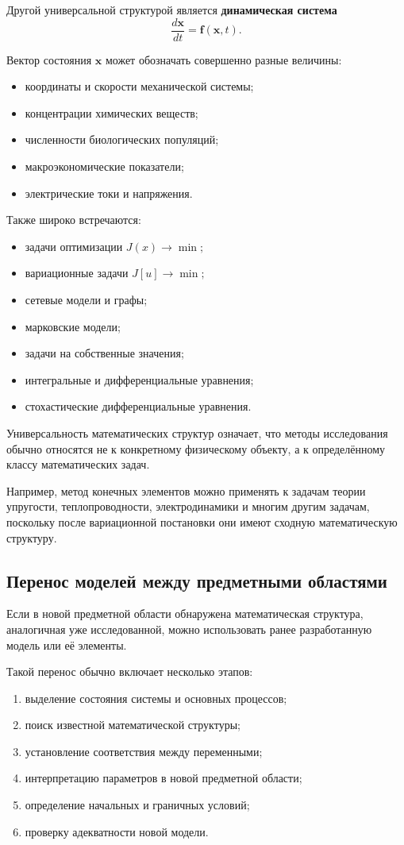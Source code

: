 Другой универсальной структурой является \textbf{динамическая система}
\[
\frac{d\mathbf x}{dt}
=
\mathbf f(\mathbf x,t).
\]

Вектор состояния $\mathbf x$ может обозначать совершенно разные величины:
\begin{itemize}
	\item координаты и скорости механической системы;
	\item концентрации химических веществ;
	\item численности биологических популяций;
	\item макроэкономические показатели;
	\item электрические токи и напряжения.
\end{itemize}

Также широко встречаются:
\begin{itemize}
	\item задачи оптимизации $J(x)\rightarrow\min;$
	\item вариационные задачи $J[u]\rightarrow\min;$
	\item сетевые модели и графы;
	\item марковские модели;
	\item задачи на собственные значения;
	\item интегральные и дифференциальные уравнения;
	\item стохастические дифференциальные уравнения.
\end{itemize}

Универсальность математических структур означает, что методы исследования обычно относятся не к конкретному физическому объекту, а к определённому классу математических задач.

Например, метод конечных элементов можно применять к задачам теории упругости, теплопроводности, электродинамики и многим другим задачам, поскольку после вариационной постановки они имеют сходную математическую структуру.

\subsection{Перенос моделей между предметными областями}

Если в новой предметной области обнаружена математическая структура, аналогичная уже исследованной, можно использовать ранее разработанную модель или её элементы.

Такой перенос обычно включает несколько этапов:
\begin{enumerate}
	\item выделение состояния системы и основных процессов;
	\item поиск известной математической структуры;
	\item установление соответствия между переменными;
	\item интерпретацию параметров в новой предметной области;
	\item определение начальных и граничных условий;
	\item проверку адекватности новой модели.
\end{enumerate}

